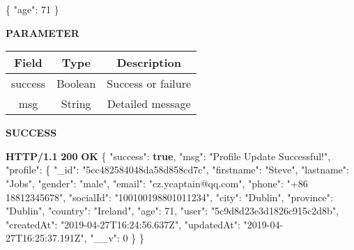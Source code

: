 \documentclass[
]{article}
\newenvironment{Shaded}{}{}
\newcommand{\DataTypeTok}[1]{\textcolor[rgb]{0.56,0.13,0.00}{#1}}
\newcommand{\DecValTok}[1]{\textcolor[rgb]{0.25,0.63,0.44}{#1}}
\newcommand{\ErrorTok}[1]{\textcolor[rgb]{1.00,0.00,0.00}{\textbf{#1}}}
\newcommand{\FunctionTok}[1]{\textcolor[rgb]{0.02,0.16,0.49}{#1}}
\newcommand{\KeywordTok}[1]{\textcolor[rgb]{0.00,0.44,0.13}{\textbf{#1}}}
\newcommand{\StringTok}[1]{\textcolor[rgb]{0.25,0.44,0.63}{#1}}
\begin{document}
\begin{Shaded}
\begin{Highlighting}[]
\FunctionTok{\{}
	\DataTypeTok{"age"}\FunctionTok{:} \DecValTok{71}
\FunctionTok{\}}
\end{Highlighting}
\end{Shaded}

\textbf{PARAMETER}

\begin{longtable}[]{@{}ccc@{}}
\toprule
Field & Type & Description\tabularnewline
\midrule
\endhead
success & Boolean & Success or failure\tabularnewline
msg & String & Detailed message\tabularnewline
\bottomrule
\end{longtable}

\textbf{SUCCESS}

\begin{Shaded}
\begin{Highlighting}[]
\ErrorTok{HTTP/1.1} \ErrorTok{200} \ErrorTok{OK}
\FunctionTok{\{}
    \DataTypeTok{"success"}\FunctionTok{:} \KeywordTok{true}\FunctionTok{,}
    \DataTypeTok{"msg"}\FunctionTok{:} \StringTok{"Profile Update Successful!"}\FunctionTok{,}
    \DataTypeTok{"profile"}\FunctionTok{:} \FunctionTok{\{}
        \DataTypeTok{"_id"}\FunctionTok{:} \StringTok{"5cc482584048da58d858cd7c"}\FunctionTok{,}
        \DataTypeTok{"firstname"}\FunctionTok{:} \StringTok{"Steve"}\FunctionTok{,}
        \DataTypeTok{"lastname"}\FunctionTok{:} \StringTok{"Jobs"}\FunctionTok{,}
        \DataTypeTok{"gender"}\FunctionTok{:} \StringTok{"male"}\FunctionTok{,}
        \DataTypeTok{"email"}\FunctionTok{:} \StringTok{"cz.ycaptain@qq.com"}\FunctionTok{,}
        \DataTypeTok{"phone"}\FunctionTok{:} \StringTok{"+86 18812345678"}\FunctionTok{,}
        \DataTypeTok{"socialId"}\FunctionTok{:} \StringTok{"100100198801011234"}\FunctionTok{,}
        \DataTypeTok{"city"}\FunctionTok{:} \StringTok{"Dublin"}\FunctionTok{,}
        \DataTypeTok{"province"}\FunctionTok{:} \StringTok{"Dublin"}\FunctionTok{,}
        \DataTypeTok{"country"}\FunctionTok{:} \StringTok{"Ireland"}\FunctionTok{,}
        \DataTypeTok{"age"}\FunctionTok{:} \DecValTok{71}\FunctionTok{,}
        \DataTypeTok{"user"}\FunctionTok{:} \StringTok{"5c9d8d23e3d1826c915c2d8b"}\FunctionTok{,}
        \DataTypeTok{"createdAt"}\FunctionTok{:} \StringTok{"2019-04-27T16:24:56.637Z"}\FunctionTok{,}
        \DataTypeTok{"updatedAt"}\FunctionTok{:} \StringTok{"2019-04-27T16:25:37.191Z"}\FunctionTok{,}
        \DataTypeTok{"__v"}\FunctionTok{:} \DecValTok{0}
    \FunctionTok{\}}
\FunctionTok{\}}
\end{Highlighting}
\end{Shaded}
\end{document}
